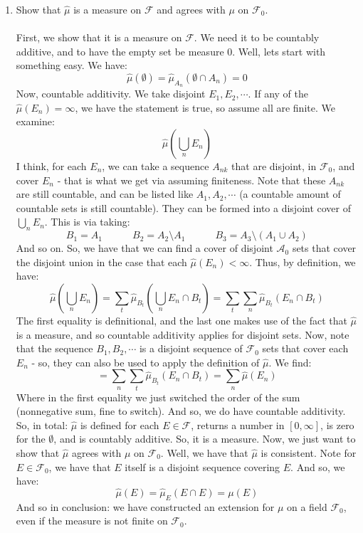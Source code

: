 \documentclass[12pt,a4paper]{article}
\newcommand{\1}[1]{\mathbbm{1}\left\{ #1 \right\}}
\newcommand{\acal}{\mathcal{A}}
\newcommand{\fcal}{\mathcal{F}}
\begin{document}
\begin{enumerate}
	\item Show that $\hat{\mu}$ is a measure on $\fcal$ and agrees with $\mu$ on $\fcal_0$.
	\\\\
	First, we show that it is a measure on $\fcal$. We need it to be countably additive, and to have the empty set be measure $0$. Well, lets start with something easy. We have:
	$$
		\hat{\mu}(\emptyset) = \hat{\mu}_{A_n}(\emptyset \cap A_n) = 0
	$$
	Now, countable additivity. We take disjoint $E_1, E_2, \cdots$. If any of the $\hat{\mu}(E_n) = \infty$, we have the statement is true, so assume all are finite. We examine:
	$$
		\hat{\mu}\left(\bigcup_n E_n\right)
	$$
	I think, for each $E_n$, we can take a sequence $A_{nk}$ that are disjoint, in $\fcal_0$, and cover $E_n$ - that is what we get via assuming finiteness. Note that these $A_{nk}$ are still countable, and can be listed like $A_1, A_2, \cdots$ (a countable amount of countable sets is still countable). They can be formed into a disjoint cover of $\bigcup_n E_n$. This is via taking:
	$$
		B_1 = A_1 \quad\quad\quad
		B_2 = A_2 \setminus A_1 \quad\quad\quad
		B_3 = A_3 \setminus (A_1 \cup A_2)
	$$
	And so on. So, we have that we can find a cover of disjoint $\acal_0$ sets that cover the disjoint union in the case that each $\hat{\mu}(E_n) < \infty$. Thus, by definition, we have:
	$$
		\hat{\mu}\left(\bigcup_n E_n\right) =
		\sum_t \hat{\mu}_{B_t}\left(\bigcup_n E_n \cap B_t\right) =
		\sum_t \sum_n \hat{\mu}_{B_t}\left(E_n \cap B_t\right)
	$$
	The first equality is definitional, and the last one makes use of the fact that $\hat{\mu}$ is a measure, and so countable additivity applies for disjoint sets. Now, note that the sequence $B_1, B_2, \cdots$ is a disjoint sequence of $\fcal_0$ sets that cover each $E_n$ - so, they can also be used to apply the definition of $\hat{\mu}$. We find:
	$$
		= \sum_n \sum_t \hat{\mu}_{B_t}\left(E_n \cap B_t\right)
		= \sum_n \hat{\mu}(E_n)
	$$
	Where in the first equality we just switched the order of the sum (nonnegative sum, fine to switch). And so, we do have countable additivity. So, in total: $\hat{\mu}$ is defined for each $E \in \fcal$, returns a number in $[0,\infty]$, is zero for the $\emptyset$, and is countably additive. So, it is a measure. Now, we just want to show that $\hat{\mu}$ agrees with $\mu$ on $\fcal_0$. Well, we have that $\hat{\mu}$ is consistent. Note for $E \in \fcal_0$, we have that $E$ itself is a disjoint sequence covering $E$. And so, we have:
	$$
		\hat{\mu}(E) = \hat{\mu}_E(E \cap E) = \mu(E)
	$$
	And so in conclusion: we have constructed an extension for $\mu$ on a field $\fcal_0$, even if the measure is not finite on $\fcal_0$.
	
\end{enumerate}
\end{document}
